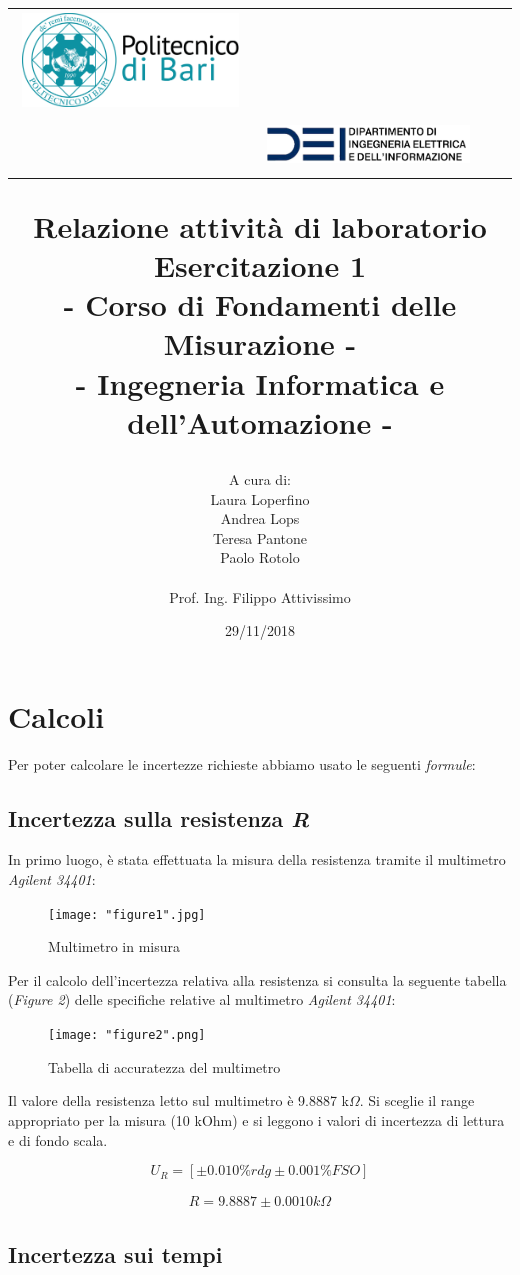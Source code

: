 \documentclass[a4paper]{article}
\title{\begin{center}
		\setlength{\tabcolsep}{0pt}
		\begin{tabular}{>{\raggedleft}m{3cm}>{\centering}m{\textwidth - 5cm\relax}>{\raggedright}m{3cm}}
			\includegraphics[width=\linewidth]{poliba.png}%
			&%
			\textbf{ } \\[5pt]%
			\textbf{\ }%
			&%
			\includegraphics[width=\linewidth]{dei.png} %
		\end{tabular}
	\end{center}
	\textbf{Relazione attività di laboratorio\\}
	\textbf{\large Esercitazione 1\\- Corso di Fondamenti delle Misurazione -\\ }
	{\normalsize 
		- Ingegneria Informatica e dell'Automazione -
}}
\author{A cura di:\\
	Laura Loperfino\\
	Andrea Lops \\
	Teresa Pantone\\
	Paolo Rotolo\\
	\\
	Prof. Ing. Filippo Attivissimo
}
\date{29/11/2018}
\begin{document}
\maketitle

\section{Calcoli}

Per poter calcolare le incertezze richieste abbiamo usato le seguenti \emph{formule}:\\
\subsection {Incertezza sulla resistenza \emph{R}}

In primo luogo, è stata effettuata la misura della resistenza tramite il multimetro \emph{Agilent 34401}:

\begin{figure}[htp]
	\centering
	\texttt{[image: "figure1".jpg]}
	\caption{Multimetro in misura}
	\label{}
\end{figure}
\noindent 
Per il calcolo dell'incertezza relativa alla resistenza si consulta la seguente tabella (\emph{Figure 2}) delle specifiche relative al multimetro \emph{Agilent 34401}:
\begin{center}
	\begin{figure}[htp]
		\centering
		\texttt{[image: "figure2".png]}
		\caption{Tabella di accuratezza del multimetro}
		\label{a}
	\end{figure}
\end{center}

Il valore della resistenza letto sul multimetro è  9.8887 k$\Omega$. Si sceglie il range appropriato per la misura (10 kOhm) e si leggono i valori di incertezza di lettura e di fondo scala.

\begin{Large} 
	\begin{equation} 
		U_{R} = [\pm 0.010\%rdg \pm 0.001\% FSO]
	 \end{equation}
	 
	 \begin{eqnarray*} 
	 	R = 9.8887 \pm 0.0010 k\Omega 
	 \end{eqnarray*}
\end{Large}

\subsection {Incertezza sui tempi}
\end{document}
